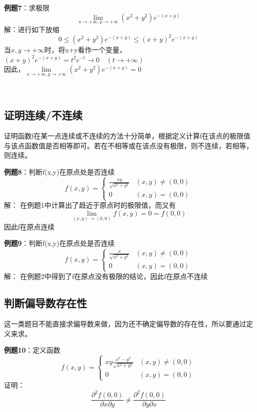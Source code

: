 \documentclass{article}
\begin{document}
\textbf{例题7}：求极限
\[\lim\limits_{x \rightarrow +\infty,y \rightarrow+\infty}(x^2+y^2)e^{-(x+y)} \]
\quad \quad 解：进行如下放缩
\[0 \leq (x^2+y^2)e^{-(x+y)}  \leq(x+y)^2e^{-(x+y)}\]
当$x,y \rightarrow +\infty$时，将x+y看作一个变量，$(x+y)^2e^{-(x+y)} = t^2e^{-t} \rightarrow 0 \quad (t \rightarrow +\infty)$  \\
因此，$\lim\limits_{x \rightarrow +\infty,y \rightarrow+\infty}(x^2+y^2)e^{-(x+y)} = 0$

~\\

\subsection{证明连续/不连续}
证明函数f在某一点连续或不连续的方法十分简单，根据定义计算f在该点的极限值与该点函数值是否相等即可。若在不相等或在该点没有极限，则不连续，若相等，则连续。

\textbf{例题8}：判断f(x,y)在原点处是否连续
\[f(x,y)= \begin{cases} \frac{xy}{ \sqrt{x^2+y^2} }  & (x,y) \neq (0,0)\\0 & (x,y) = (0,0)\end{cases}\]
\quad \quad 解：
在例题1中计算出了趋近于原点时的极限值，而又有
\[\lim\limits_{(x,y) \rightarrow (0,0)}f(x,y) = 0 = f(0,0)\]
因此f在原点连续

\textbf{例题9}：判断f(x,y)在原点处是否连续
\[f(x,y)= \begin{cases} \frac{x}{ \sqrt{x^2+y^2} }  & (x,y) \neq (0,0)\\0 & (x,y) = (0,0)\end{cases}\]
\quad \quad 解：
在例题2中得到了f在原点没有极限的结论，因此f在原点不连续

\subsection{判断偏导数存在性}
这一类题目不能直接求偏导数来做，因为还不确定偏导数的存在性，所以要通过定义来求。

\textbf{例题10}：定义函数
\[f(x,y)= \begin{cases} xy\frac{x^2-y^2}{ \sqrt{x^2+y^2} }  & (x,y) \neq (0,0)\\0 & (x,y) = (0,0)\end{cases}\]
证明：
\[\frac{\partial^2 f(0,0)}{\partial x \partial y}  \neq \frac{\partial^2 f(0,0)}{\partial y \partial x}\]
\end{document}
